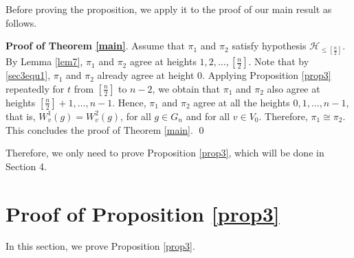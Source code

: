 \documentclass[12pt]{amsart}
\begin{document}
Before proving the proposition, we apply it to the proof of our main result as follows.

\textbf{Proof of Theorem \ref{main}}. 
Assume that $\pi_1$ and $\pi_2$ satisfy hypothesis ${{\mathcal {H}}}_{\leq [\frac{n}{2}]}$. By Lemma \ref{lem7}, $\pi_1$ and $\pi_2$ agree at heights $1, 2, \ldots, [\frac{n}{2}]$. Note that by \eqref{sec3equ1}, $\pi_1$ and $\pi_2$ already agree at height 0.
Applying Proposition \ref{prop3} repeatedly for $t$ from $[\frac{n}{2}]$ to $n-2$, we obtain that $\pi_1$ and $\pi_2$ also agree at heights $[\frac{n}{2}]+1, \ldots, n-1$. 
Hence, $\pi_1$ and $\pi_2$ agree at all the heights $0, 1, \ldots, n-1$, that is, $W^1_v(g)=W^2_v(g)$, for all $g \in G_n$ and for all $v \in V_0$. Therefore, $\pi_1 \cong \pi_2$. 
This concludes the proof of Theorem \ref{main}. \qed

Therefore, we only need to prove Proposition \ref{prop3}, which will be done in Section 4. 

\section{Proof of Proposition \ref{prop3}}

In this section, we prove Proposition \ref{prop3}.
\end{document}
